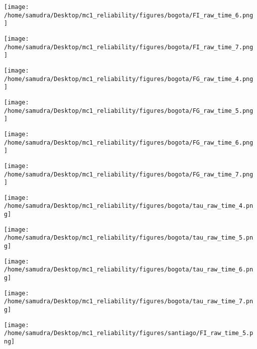 \documentclass[a4paper]{article}
\def\lthtmlcheckvsize{\ifdim\ht\sizebox<\vsize 
  \ifdim\wd\sizebox<\hsize\expandafter\hfill\fi \expandafter\vfill
  \else\expandafter\vss\fi}%
\begin{document}
{\newpage\clearpage
{}%
\texttt{[image: /home/samudra/Desktop/mc1\_reliability/figures/bogota/FI\_raw\_time\_6.png]}%
\lthtmlpictureZ
\lthtmlcheckvsize\clearpage}

{\newpage\clearpage
{}%
\texttt{[image: /home/samudra/Desktop/mc1\_reliability/figures/bogota/FI\_raw\_time\_7.png]}%
\lthtmlpictureZ
\lthtmlcheckvsize\clearpage}

{\newpage\clearpage
{}%
\texttt{[image: /home/samudra/Desktop/mc1\_reliability/figures/bogota/FG\_raw\_time\_4.png]}%
\lthtmlpictureZ
\lthtmlcheckvsize\clearpage}

{\newpage\clearpage
{}%
\texttt{[image: /home/samudra/Desktop/mc1\_reliability/figures/bogota/FG\_raw\_time\_5.png]}%
\lthtmlpictureZ
\lthtmlcheckvsize\clearpage}

{\newpage\clearpage
{}%
\texttt{[image: /home/samudra/Desktop/mc1\_reliability/figures/bogota/FG\_raw\_time\_6.png]}%
\lthtmlpictureZ
\lthtmlcheckvsize\clearpage}

{\newpage\clearpage
{}%
\texttt{[image: /home/samudra/Desktop/mc1\_reliability/figures/bogota/FG\_raw\_time\_7.png]}%
\lthtmlpictureZ
\lthtmlcheckvsize\clearpage}

{\newpage\clearpage
{}%
\texttt{[image: /home/samudra/Desktop/mc1\_reliability/figures/bogota/tau\_raw\_time\_4.png]}%
\lthtmlpictureZ
\lthtmlcheckvsize\clearpage}

{\newpage\clearpage
{}%
\texttt{[image: /home/samudra/Desktop/mc1\_reliability/figures/bogota/tau\_raw\_time\_5.png]}%
\lthtmlpictureZ
\lthtmlcheckvsize\clearpage}

{\newpage\clearpage
{}%
\texttt{[image: /home/samudra/Desktop/mc1\_reliability/figures/bogota/tau\_raw\_time\_6.png]}%
\lthtmlpictureZ
\lthtmlcheckvsize\clearpage}

{\newpage\clearpage
{}%
\texttt{[image: /home/samudra/Desktop/mc1\_reliability/figures/bogota/tau\_raw\_time\_7.png]}%
\lthtmlpictureZ
\lthtmlcheckvsize\clearpage}

{\newpage\clearpage
{}%
\texttt{[image: /home/samudra/Desktop/mc1\_reliability/figures/santiago/FI\_raw\_time\_5.png]}%
\lthtmlpictureZ
\lthtmlcheckvsize\clearpage}
\end{document}
